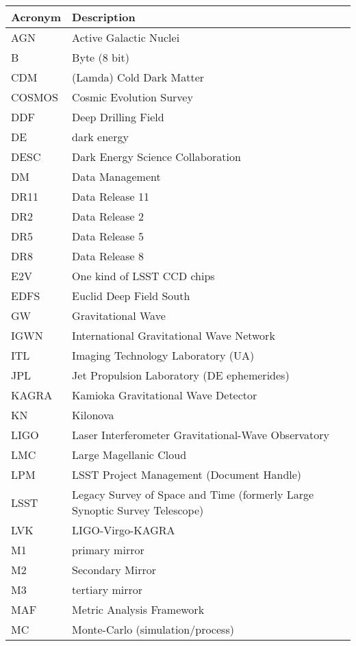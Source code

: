 \addtocounter{table}{-1}
\begin{longtable}{p{}p{}}\hline
\textbf{Acronym} & \textbf{Description}  \\\hline

AGN & Active Galactic Nuclei \\\hline
B & Byte (8 bit) \\\hline
CDM & (Lamda) Cold Dark Matter \\\hline
COSMOS & Cosmic Evolution Survey \\\hline
DDF & Deep Drilling Field \\\hline
DE & dark energy \\\hline
DESC & Dark Energy Science Collaboration \\\hline
DM & Data Management \\\hline
DR11 & Data Release 11 \\\hline
DR2 & Data Release 2 \\\hline
DR5 & Data Release 5 \\\hline
DR8 & Data Release 8 \\\hline
E2V & One kind of LSST CCD chips \\\hline
EDFS & Euclid Deep Field South \\\hline
GW & Gravitational Wave \\\hline
IGWN & International Gravitational Wave Network \\\hline
ITL & Imaging Technology Laboratory (UA) \\\hline
JPL & Jet Propulsion Laboratory (DE ephemerides) \\\hline
KAGRA & Kamioka Gravitational Wave Detector \\\hline
KN & Kilonova \\\hline
LIGO & Laser Interferometer Gravitational-Wave Observatory \\\hline
LMC & Large Magellanic Cloud \\\hline
LPM & LSST Project Management (Document Handle) \\\hline
LSST & Legacy Survey of Space and Time (formerly Large Synoptic Survey Telescope) \\\hline
LVK & LIGO-Virgo-KAGRA \\\hline
M1 & primary mirror \\\hline
M2 & Secondary Mirror \\\hline
M3 & tertiary mirror \\\hline
MAF & Metric Analysis Framework \\\hline
MC & Monte-Carlo (simulation/process) \\\hline

\end{longtable}
